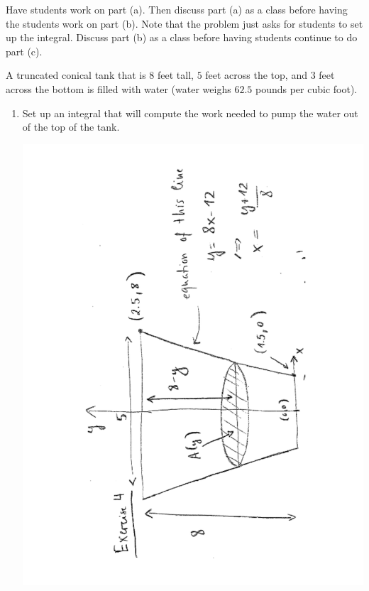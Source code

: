 \documentclass[noinstructornotes]{ximera}
\begin{document}
\begin{instructorNotes}
Have students work on part (a). Then discuss part (a) as a class before having the students work on part (b). Note that the problem just asks for students to set up the integral. Discuss part (b) as a class before having students continue to do part (c).
\end{instructorNotes}







\begin{problem}
A truncated conical tank that is $8$ feet tall, $5$ feet across the top, and $3$ feet across the bottom is filled with water (water weighs $62.5$ pounds per cubic foot).  
\begin{enumerate}
		\item  Set up an integral that will compute the work needed to pump the water out of the top of the tank.  
		\begin{freeResponse}
			\begin{image}
			\includegraphics[trim= 120 320 100 180, angle=-89.99, scale=0.6]{Figure6-7-1.pdf}
			\end{image}
		

\end{freeResponse}
\end{enumerate}
\end{problem}
\end{document}
